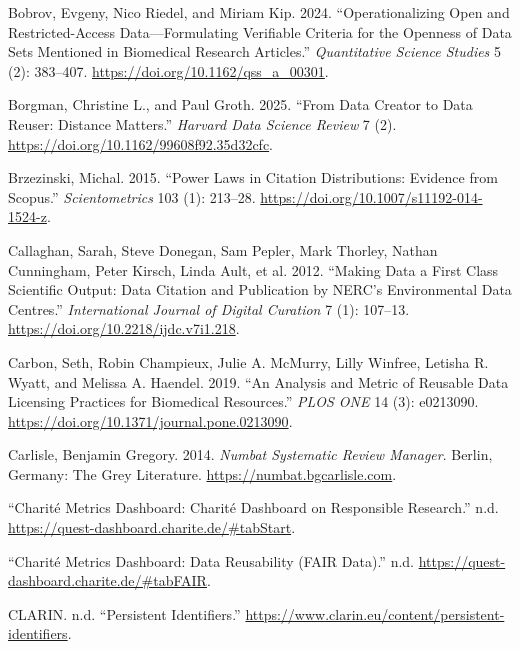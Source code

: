 \documentclass[
  letterpaper,
  DIV=11,
  numbers=noendperiod]{scrartcl}
\newlength{\cslhangindent}
\newenvironment{CSLReferences}[2] %
 {\begin{list}{}{%
  \setlength{\itemindent}{0pt}
  \setlength{\leftmargin}{0pt}
  \setlength{\parsep}{0pt}
  \ifodd #1
   \setlength{\leftmargin}{\cslhangindent}
   \setlength{\itemindent}{-1\cslhangindent}
  \fi
  \setlength{\itemsep}{#2\baselineskip}}}
 {\end{list}}
\begin{document}
\begin{CSLReferences}{1}{0}
Bobrov, Evgeny, Nico Riedel, and Miriam Kip. 2024. {``Operationalizing
Open and Restricted-Access Data---{Formulating} Verifiable Criteria for
the Openness of Data Sets Mentioned in Biomedical Research Articles.''}
\emph{Quantitative Science Studies} 5 (2): 383--407.
\url{https://doi.org/10.1162/qss_a_00301}.

Borgman, Christine L., and Paul Groth. 2025. {``From {Data Creator} to
{Data Reuser}: {Distance Matters}.''} \emph{Harvard Data Science Review}
7 (2). \url{https://doi.org/10.1162/99608f92.35d32cfc}.

Brzezinski, Michal. 2015. {``Power Laws in Citation Distributions:
Evidence from Scopus.''} \emph{Scientometrics} 103 (1): 213--28.
\url{https://doi.org/10.1007/s11192-014-1524-z}.

Callaghan, Sarah, Steve Donegan, Sam Pepler, Mark Thorley, Nathan
Cunningham, Peter Kirsch, Linda Ault, et al. 2012. {``Making Data a
First Class Scientific Output: Data Citation and Publication by NERC{'}s
Environmental Data Centres.''} \emph{International Journal of Digital
Curation} 7 (1): 107--13. \url{https://doi.org/10.2218/ijdc.v7i1.218}.

Carbon, Seth, Robin Champieux, Julie A. McMurry, Lilly Winfree, Letisha
R. Wyatt, and Melissa A. Haendel. 2019. {``An Analysis and Metric of
Reusable Data Licensing Practices for Biomedical Resources.''}
\emph{PLOS ONE} 14 (3): e0213090.
\url{https://doi.org/10.1371/journal.pone.0213090}.

Carlisle, Benjamin Gregory. 2014. \emph{Numbat {S}ystematic {R}eview
{M}anager}. Berlin, Germany: The Grey Literature.
\url{https://numbat.bgcarlisle.com}.

{``Charité Metrics Dashboard: Charité Dashboard on Responsible
Research.''} n.d. \url{https://quest-dashboard.charite.de/\#tabStart}.

{``Charité Metrics Dashboard: Data Reusability (FAIR Data).''} n.d.
\url{https://quest-dashboard.charite.de/\#tabFAIR}.

CLARIN. n.d. {``Persistent {Identifiers}.''}
\url{https://www.clarin.eu/content/persistent-identifiers}.


\end{CSLReferences}
\end{document}
